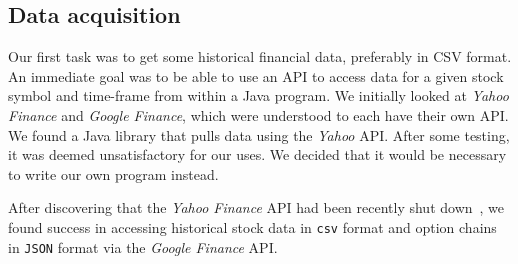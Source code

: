 \documentclass[../Dissertation.tex]{subfiles}
\begin{document}
\subsection{Data acquisition}

Our first task was to get some historical financial data, preferably in CSV format. An immediate goal was to be able to use an API to access data for a given stock symbol and time-frame from within a Java program.
We initially looked at \textit{Yahoo Finance} and \textit{Google Finance}, which were understood to each have their own API.
We found a Java library\cite{FinanceQuotes:2017} that pulls data using the \textit{Yahoo} API. After some testing, it was deemed unsatisfactory for our uses. We decided that it would be necessary to write our own program instead.

After discovering that the \textit{Yahoo Finance} API had been recently shut down~\cite{Nixon:2017}, we found success in accessing historical stock data in \lstinline|csv| format and option chains in \lstinline|JSON| format via the \textit{Google Finance} API.
\end{document}
